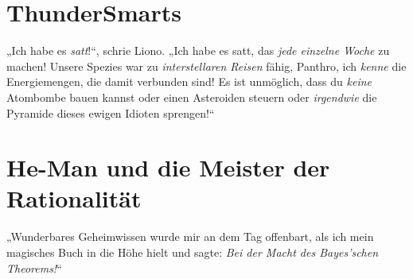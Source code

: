 \section{ThunderSmarts}

„Ich habe es \emph{satt}!“, schrie Liono. „Ich habe es satt, das \emph{jede einzelne Woche} zu machen! Unsere Spezies war zu \emph{interstellaren Reisen} fähig, Panthro, ich \emph{kenne} die Energiemengen, die damit verbunden sind! Es ist unmöglich, dass du \emph{keine} Atombombe bauen kannst oder einen Asteroiden steuern oder \emph{irgendwie} die Pyramide dieses ewigen Idioten sprengen!“

\section{He-Man und die Meister der Rationalität}

„Wunderbares Geheimwissen wurde mir an dem Tag offenbart, als ich mein magisches Buch in die Höhe hielt und sagte: \emph{Bei der Macht des Bayes’schen Theorems!}“

